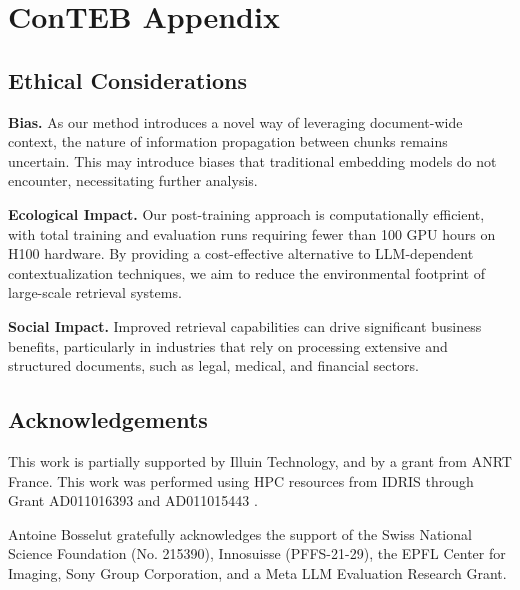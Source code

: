 \chapter{ConTEB Appendix}

\section*{Ethical Considerations}

\noindent\textbf{Bias.} As our method introduces a novel way of leveraging document-wide context, the nature of information propagation between chunks remains uncertain. This may introduce biases that traditional embedding models do not encounter, necessitating further analysis.

\noindent\textbf{Ecological Impact.} Our post-training approach is computationally efficient, with total training and evaluation runs requiring fewer than 100 GPU hours on H100 hardware. By providing a cost-effective alternative to LLM-dependent contextualization techniques, we aim to reduce the environmental footprint of large-scale retrieval systems.

\noindent\textbf{Social Impact.} Improved retrieval capabilities can drive significant business benefits, particularly in industries that rely on processing extensive and structured documents, such as legal, medical, and financial sectors.






\section*{Acknowledgements}

This work is partially supported by Illuin Technology, and by a grant from ANRT France. This work was performed using HPC resources from IDRIS through Grant AD011016393 and AD011015443 .

Antoine Bosselut gratefully acknowledges the support of the Swiss National Science Foundation (No. 215390), Innosuisse (PFFS-21-29), the EPFL Center for Imaging, Sony Group Corporation, and a Meta LLM Evaluation Research Grant.


